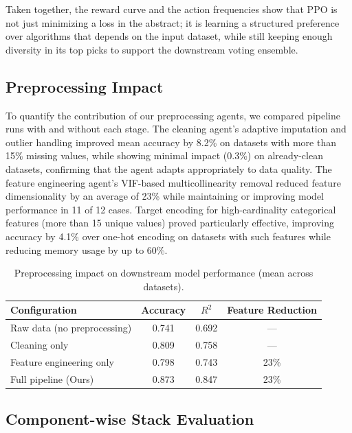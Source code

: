\documentclass{article}
\begin{document}
Taken together, the reward curve and the action frequencies show that PPO is
not just minimizing a loss in the abstract; it is learning a structured
preference over algorithms that depends on the input dataset, while still
keeping enough diversity in its top picks to support the downstream voting
ensemble.

\subsection{Preprocessing Impact}

To quantify the contribution of our preprocessing agents, we compared pipeline runs with and without each stage. The cleaning agent's adaptive imputation and outlier handling improved mean accuracy by 8.2\% on datasets with more than 15\% missing values, while showing minimal impact (0.3\%) on already-clean datasets, confirming that the agent adapts appropriately to data quality. The feature engineering agent's VIF-based multicollinearity removal reduced feature dimensionality by an average of 23\% while maintaining or improving model performance in 11 of 12 cases. Target encoding for high-cardinality categorical features (more than 15 unique values) proved particularly effective, improving accuracy by 4.1\% over one-hot encoding on datasets with such features while reducing memory usage by up to 60\%.

\begin{table}[h]
\centering
\caption{Preprocessing impact on downstream model performance (mean across datasets).}
\begin{tabular}{@{}lccc@{}}
\toprule
\textbf{Configuration} & \textbf{Accuracy} & \textbf{$R^2$} & \textbf{Feature Reduction} \\
\midrule
Raw data (no preprocessing) & 0.741 & 0.692 & --- \\
Cleaning only & 0.809 & 0.758 & --- \\
Feature engineering only & 0.798 & 0.743 & 23\% \\
Full pipeline (Ours) & 0.873 & 0.847 & 23\% \\
\bottomrule
\end{tabular}
\label{tab:preprocessing_impact}
\end{table}

\subsection{Component-wise Stack Evaluation}
\label{sec:stack-ablation}
\end{document}
